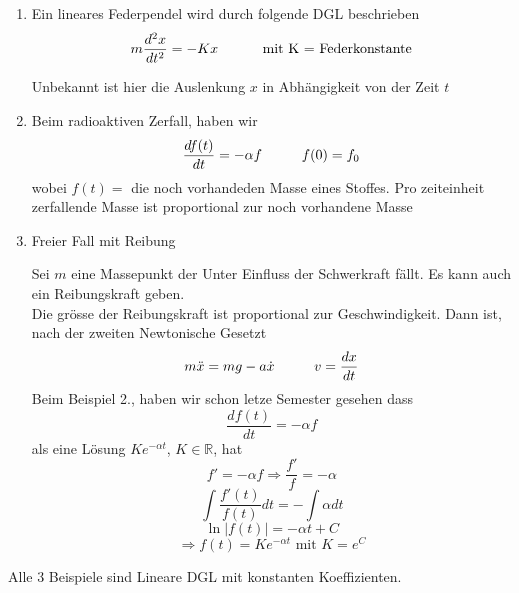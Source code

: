 \begin{enumerate}
\item Ein lineares Federpendel wird durch folgende DGL beschrieben $$m\frac{d^2x}{dt^2}=-Kx\text{\hspace{10mm} mit K = Federkonstante}$$
\begin{center}
\end{center}
Unbekannt ist hier die Auslenkung $x$ in Abhängigkeit von der Zeit $t$
\item Beim radioaktiven Zerfall, haben wir $$\frac{df(t)}{dt}=-\alpha f\text{\hspace{10mm}}f(0)=f_0$$
wobei $f(t)=$ die noch vorhandeden Masse eines Stoffes. Pro zeiteinheit zerfallende Masse ist proportional zur noch vorhandene Masse
\item Freier Fall mit Reibung
\begin{center}
\end{center}
Sei $m$ eine Massepunkt der Unter Einfluss der Schwerkraft fällt. Es kann auch ein Reibungskraft geben. \\

Die grösse der Reibungskraft ist proportional zur Geschwindigkeit. Dann ist, nach der zweiten Newtonische Gesetzt \[m\ddot x = mg - a\dot x\text{\hspace{10mm}}v=\frac{dx}{dt}\]
Beim Beispiel 2., haben wir schon letze Semester gesehen dass $$\frac{df(t)}{dt}=-\alpha f$$ als eine Lösung $Ke^{-\alpha t}$, $K\in\mathbb{R}$, hat 
$$f'=-\alpha f\Rightarrow \frac{f'}{f}=-\alpha$$
$$\int{\frac{f'(t)}{f(t)}dt}=-\int{\alpha dt}$$
$$\ln\left| f(t)\right|=-\alpha t+C$$
$$\Rightarrow f(t)=Ke^{-\alpha t}\text{ mit }K={e^C}$$
\end{enumerate}
Alle 3 Beispiele sind Lineare DGL mit konstanten Koeffizienten. 

